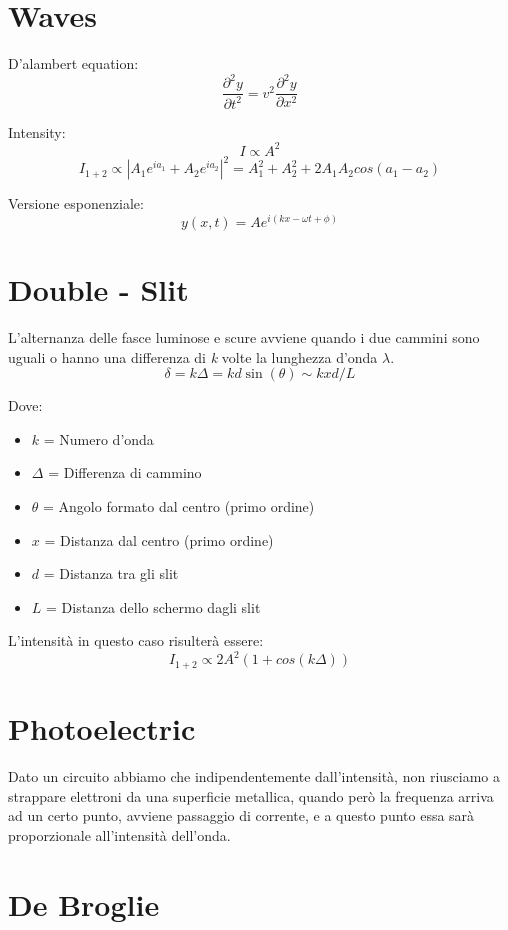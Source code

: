 
\section{Waves}

\noindent D'alambert equation:
$$\frac{\partial^2y}{\partial t^2} = v^2 \frac{\partial^2y}{\partial x^2}$$

\noindent Intensity:
$$I \propto A^2$$
$$I_{1+2} \propto |A_1e^{ia_1} + A_2e^{ia_2}|^2 = A_1^2 + A_2^2 + 2A_1A_2cos(a_1 - a_2)$$

\noindent Versione esponenziale:
$$y(x, t) = Ae^{i(kx - \omega t + \phi)}$$

\section{Double - Slit}

\noindent L'alternanza delle fasce luminose e scure avviene quando i due cammini sono uguali o hanno una differenza di \textit{k} volte la lunghezza d'onda $\lambda$.
$$\delta = k\Delta = kd\sin(\theta) \sim kxd / L$$

\noindent Dove:
\begin{itemize}
    \item $k$ = Numero d'onda
    \item $\Delta$ = Differenza di cammino
    \item $\theta$ = Angolo formato dal centro (primo ordine)
    \item $x$ = Distanza dal centro (primo ordine)
    \item $d$ = Distanza tra gli slit
    \item $L$ = Distanza dello schermo dagli slit
\end{itemize}

L'intensità in questo caso risulterà essere:
$$I_{1+2} \propto 2A^2(1 + cos(k\Delta))$$

\section{Photoelectric}

\noindent Dato un circuito abbiamo che indipendentemente dall'intensità, non riusciamo a strappare elettroni da una superficie metallica, quando però la frequenza arriva ad un certo punto, avviene passaggio di corrente, e a questo punto essa sarà proporzionale all'intensità dell'onda.

\section{De Broglie}

